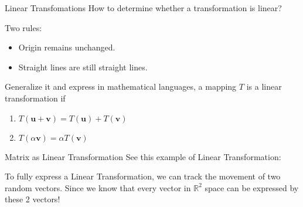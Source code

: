 \documentclass{beamer}
\begin{document}
\begin{frame}{Linear Transfomations}
How to determine whether a transformation is linear?

\vspace{5pt}
Two rules:
\begin{itemize}
    \item Origin remains unchanged.
    \item Straight lines are still straight lines.
\end{itemize}

Generalize it and express in mathematical languages, a mapping $T$ is a linear transformation if
\begin{enumerate}
    \item $T\left( \mathbf{u}+\mathbf{v} \right) =T\left( \mathbf{u} \right) +T\left( \mathbf{v} \right)$
    \item $T\left( \alpha \mathbf{v} \right) =\alpha T\left( \mathbf{v} \right) $
\end{enumerate}
\end{frame}

\begin{frame}{Matrix as Linear Transformation}
See this example of Linear Transformation:


To fully express a Linear Transformation, we can track the movement of two random vectors. Since we know that every vector in $\mathbb{R}^2$ space can be expressed by these 2 vectors!
\end{frame}
\end{document}
